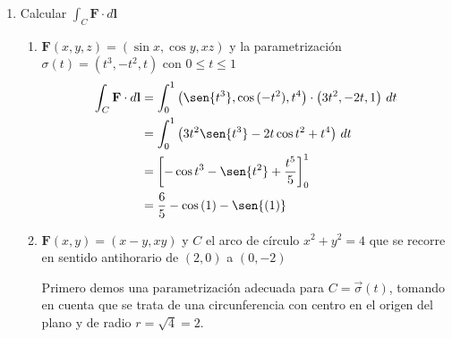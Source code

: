 \documentclass{article}
\begin{document}
\begin{enumerate}
        \item {
           Calcular $\displaystyle\int_{C} \mathbf{F} \cdot d \mathbf{l}$

            \begin{enumerate}
            \item{
                $\mathbf{F} (x,y,z) = (\sin x,\cos y,xz)$ y la parametrización
                $\sigma (t) = (t^3,-t^2,t)$ con $0\leq t\leq 1$
                \color{azul}
                \begin{align*}
                    \int_{C}{\mathbf{F} \cdot d \mathbf{l}}
                    &= \int_{0}^{1}{
                        \left(\sen{t^3}, \cos{(-t^2)}, t^4\right)
                        \cdot\left(3t^2, -2t, 1 \right)
                    \,dt}\\
                    &= \int_{0}^{1}{\left(
                        3t^2\sen{t^3}-2t\cos{t^2}+t^4
                    \right)\,dt}\\
                    &= \left[
                        -\cos{t^3}-\sen{t^2}+\frac{t^5}{5}
                        \right]_{0}^{1}\\
                    &= \frac{6}{5}-\cos{(1)}-\sen{(1)}
                \end{align*}
            }
            \item{
                $\mathbf{F} (x,y) = (x-y,xy)$ y $C$ el arco de círculo
                $x^2 + y^2 = 4$ que se recorre en sentido antihorario de $(2,0)$
                a $(0,-2)$

                \color{azul}
                Primero demos una parametrización adecuada para $C=\vec{\sigma}
                (t)$, tomando en cuenta que se trata de una circunferencia con
                centro en el origen del plano y de radio $r=\sqrt{4}=2$.

}
\end{enumerate}}
\end{enumerate}
\end{document}
